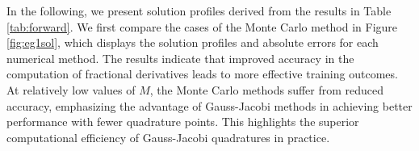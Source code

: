 \documentclass[preprint,3p,times]{elsarticle}
\begin{document}
\begin{table}[htbp]
    \caption{$L^2$ relative error and computational time for equation \eqref{eqn:eg1} with different $M$ and number of points. For each grid, the first row is the relative error, the second row is the average computational time for 5000 epochs. OoM means out of memory.}
    \label{tab:forward}
\end{table}

In the following, we present solution profiles derived from the results in Table \ref{tab:forward}. We first compare the cases of the Monte Carlo method in Figure \ref{fig:eg1sol}, which displays the solution profiles and absolute errors for each numerical method.  The results indicate that improved accuracy in the computation of fractional derivatives leads to more effective training outcomes. At relatively low values of $M$, the Monte Carlo methods suffer from reduced accuracy, emphasizing the advantage of Gauss-Jacobi methods in achieving better performance with fewer quadrature points. This highlights the superior computational efficiency of Gauss-Jacobi quadratures in practice.
\end{document}
